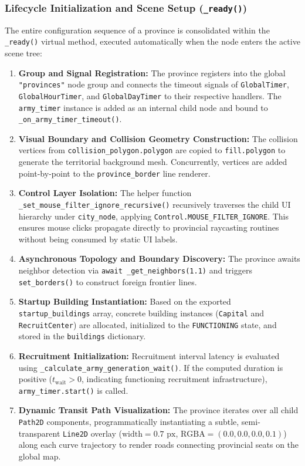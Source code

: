 \subsubsection{Lifecycle Initialization and Scene Setup (\texttt{\_ready()})}
The entire configuration sequence of a province is consolidated within the \texttt{\_ready()} virtual method, executed automatically when the node enters the active scene tree:

\begin{enumerate}
    \item \textbf{Group and Signal Registration:} The province registers into the global \texttt{"provinces"} node group and connects the timeout signals of \texttt{GlobalTimer}, \texttt{GlobalHourTimer}, and \texttt{GlobalDayTimer} to their respective handlers. The \texttt{army\_timer} instance is added as an internal child node and bound to \texttt{\_on\_army\_timer\_timeout()}.
    \item \textbf{Visual Boundary and Collision Geometry Construction:} The collision vertices from \texttt{collision\_polygon.polygon} are copied to \texttt{fill.polygon} to generate the territorial background mesh. Concurrently, vertices are added point-by-point to the \texttt{province\_border} line renderer.
    \item \textbf{Control Layer Isolation:} The helper function \texttt{\_set\_mouse\_filter\_ignore\_recursive()} recursively traverses the child UI hierarchy under \texttt{city\_node}, applying \texttt{Control.MOUSE\_FILTER\_IGNORE}. This ensures mouse clicks propagate directly to provincial raycasting routines without being consumed by static UI labels.
    \item \textbf{Asynchronous Topology and Boundary Discovery:} The province awaits neighbor detection via \texttt{await \_get\_neighbors(1.1)} and triggers \texttt{set\_borders()} to construct foreign frontier lines.
    \item \textbf{Startup Building Instantiation:} Based on the exported \texttt{startup\_buildings} array, concrete building instances (\texttt{Capital} and \texttt{RecruitCenter}) are allocated, initialized to the \texttt{FUNCTIONING} state, and stored in the \texttt{buildings} dictionary.
    \item \textbf{Recruitment Initialization:} Recruitment interval latency is evaluated using \texttt{\_calculate\_army\_generation\_wait()}. If the computed duration is positive ($t_{\text{wait}} > 0$, indicating functioning recruitment infrastructure), \texttt{army\_timer.start()} is called.
    \item \textbf{Dynamic Transit Path Visualization:} The province iterates over all child \texttt{Path2D} components, programmatically instantiating a subtle, semi-transparent \texttt{Line2D} overlay ($\text{width} = 0.7\text{ px}$, $\text{RGBA} = (0.0, 0.0, 0.0, 0.1)$) along each curve trajectory to render roads connecting provincial seats on the global map.
\end{enumerate}

